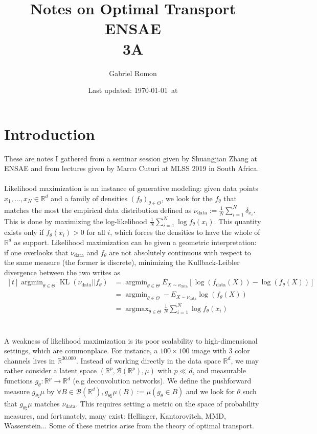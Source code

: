 \documentclass{article}
\title{Notes on Optimal Transport\\ ENSAE\\ 3A}
\author{Gabriel Romon}
\date{Last updated: \today \, at \currenttime}
\theoremstyle{definition}
\theoremstyle{remark}
\DeclareMathOperator{\argmin}{argmin}
\DeclareMathOperator{\argmax}{argmax}
\DeclareMathOperator{\kl}{KL}
\DeclareMathOperator{\data}{data}
\begin{document}
\maketitle

\section{Introduction}

These are notes I gathered from a seminar session given by Shuangjian Zhang at ENSAE and from lectures given by Marco Cuturi at MLSS 2019 in South Africa. 
\\\\
Likelihood maximization is an instance of generative modeling: given data points $x_1,\ldots,x_N\in \mathbb R^d$ and a family of densities $(f_\theta)_{\theta \in \Theta}$, we look for the $f_\theta$ that matches the most the empirical data distribution defined as $\nu_{\data}:=\frac 1N \sum_{i=1}^N \delta_{x_i}$. This is done by maximizing the log-likelihood $\frac 1N \sum_{i=1}^N \log f_\theta(x_i)$. This quantity exists only if $f_\theta(x_i)>0$ for all $i$, which forces the densities to have the whole of $\mathbb R^d$ as support. Likelihood maximization can be given a geometric interpretation: if one overlooks that $\nu_{\data}$ and $f_\theta$ are not absolutely continuous with respect to the same measure (the former is discrete), minimizing the Kullback-Leibler divergence between the two writes as $\begin{aligned}[t]\argmin_{\theta\in \Theta} \kl(\nu_{\data}||f_\theta) &= \argmin_{\theta\in \Theta} E_{X\sim \nu_{\data}}[\log(f_{\data}(X))-\log(f_\theta(X))]\\
&= \argmin_{\theta\in \Theta} -E_{X\sim \nu_{\data}}\log(f_\theta(X))\\
&= \argmax_{\theta\in \Theta} \frac 1N \sum_{i=1}^N \log f_\theta(x_i)
\end{aligned}$
\\\\\\
A weakness of likelihood maximization is its poor scalability to high-dimensional settings, which are commonplace. For instance, a $100\times 100$ image with 3 color channels lives in $\mathbb R^{30.000}$. Instead of working directly in the data space $\mathbb R^d$, we may rather consider a latent space $(\mathbb R^p, \mathcal B(\mathbb R^p), \mu)$ with $p\ll d$, and measurable functions $g_\theta:\mathbb R^p\to \mathbb R^d$ (e.g deconvolution networks). We define the pushforward measure $g_{\theta \sharp}\mu$ by $\forall B\in \mathcal B(\mathbb R^d), g_{\theta \sharp}\mu(B) := \mu(g_{\theta} \in B)$ and we look for $\theta$ such that $g_{\theta \sharp}\mu$ matches $\nu_{\data}$. This requires setting a metric on the space of probability measures, and fortunately, many exist: Hellinger, Kantorovitch, MMD, Wasserstein... Some of these metrics arise from the theory of optimal transport.
\end{document}
